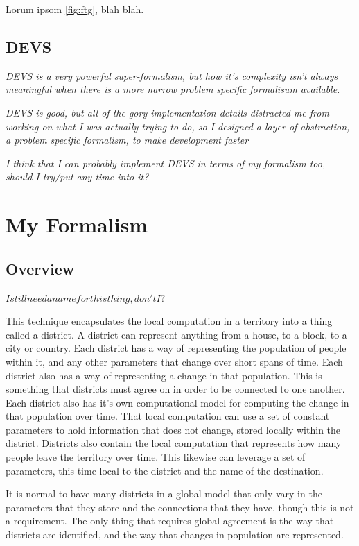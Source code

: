 \documentclass[twocolumn]{article}
\begin{document}
Lorum ipsom \ref{fig:ftg}, blah blah.

\FloatBarrier

\subsection{DEVS}


\textit{DEVS is a very powerful super-formalism, but how it's complexity isn't always meaningful when there is a more narrow problem specific formalisum available.}

\textit{DEVS is good, but all of the gory implementation details distracted me from working on what I was actually trying to do, so I designed a layer of abstraction, a problem specific formalism, to make development faster}

\textit{I think that I can probably implement DEVS in terms of my formalism too, should I try/put any time into it?}


\section{My Formalism}

\subsection{Overview}

$I still need a name for this thing, don't I?$

This technique encapsulates the local computation in a territory into a thing called a district. 
A district can represent anything from a house, to a block, to a city or country.
Each district has a way of representing the population of people within it, and any other parameters that change over short spans of time.
Each district also has a way of representing a change in that population. This is something that districts must agree on in order to be connected to one another.
Each district also has it's own computational model for computing the change in that population over time. 
That local computation can use a set of constant parameters to hold information that does not change, stored locally within the district.
Districts also contain the local computation that represents how many people leave the territory over time. This likewise can leverage a set of parameters, this time local to the district and the name of the destination.

It is normal to have many districts in a global model that only vary in the parameters that they store and the connections that they have, though this is not a requirement. The only thing that requires global agreement is the way that districts are identified, and the way that changes in population are represented.
\end{document}
